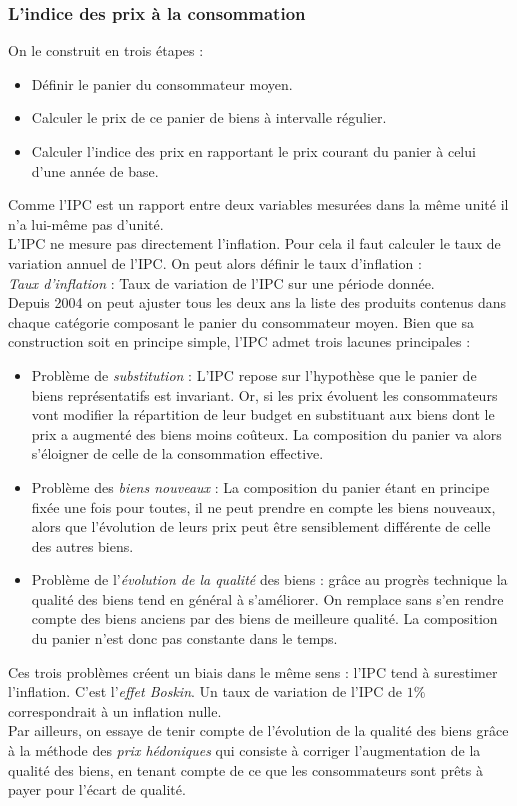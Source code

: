 \documentclass[10pt]{book}
\begin{document}
\subsubsection{L'indice des prix à la consommation}
On le construit en trois étapes : 
\begin{itemize}
  \item Définir le panier du consommateur moyen.
  \item Calculer le prix de ce panier de biens à intervalle régulier.
  \item Calculer l'indice des prix en rapportant le prix courant du panier à celui d'une année de base.
\end{itemize}
Comme l'IPC est un rapport entre deux variables mesurées dans la même unité il n'a lui-même pas d'unité. \\
L'IPC ne mesure pas directement l'inflation. Pour cela il faut calculer le taux de variation annuel de l'IPC. On peut alors définir le taux d'inflation : \\
\textit{Taux d'inflation} : Taux de variation de l'IPC sur une période donnée. \\
Depuis 2004 on peut ajuster tous les deux ans la liste des produits contenus dans chaque catégorie composant le panier du consommateur moyen. Bien que sa construction soit en principe simple, l'IPC admet trois lacunes principales : 
\begin{itemize}
  \item Problème de \textit{substitution} : L'IPC repose sur l'hypothèse que le panier de biens représentatifs est invariant. Or, si les prix évoluent les consommateurs vont modifier la répartition de leur budget en substituant aux biens dont le prix a augmenté des biens moins coûteux. La composition du panier va alors s'éloigner de celle de la consommation effective.
  \item Problème des \textit{biens nouveaux} : La composition du panier étant en principe fixée une fois pour toutes, il ne peut prendre en compte les biens nouveaux, alors que l'évolution de leurs prix peut être sensiblement différente de celle des autres biens.
  \item Problème de l'\textit{évolution de la qualité} des biens : grâce au progrès technique la qualité des biens tend en général à s'améliorer. On remplace sans s'en rendre compte des biens anciens par des biens de meilleure qualité. La composition du panier n'est donc pas constante dans le temps.
\end{itemize}
Ces trois problèmes créent un biais dans le même sens : l'IPC tend à surestimer l'inflation. C'est l'\textit{effet Boskin}. Un taux de variation de l'IPC de $1\%$ correspondrait à un inflation nulle. \\
Par ailleurs, on essaye de tenir compte de l'évolution de la qualité des biens grâce à la méthode des \textit{prix hédoniques} qui consiste à corriger l'augmentation de la qualité des biens, en tenant compte de ce que les consommateurs sont prêts à payer pour l'écart de qualité.
\end{document}
